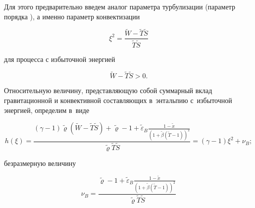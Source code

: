  Для этого предварительно введем аналог параметра турбулизации \cite{lukashev:bib50} (параметр порядка \cite{lukashev:bib29}), а именно параметр конвектизации

\begin{equation}

\label{lukashev:xi}

\xi^2=\frac{ \widetilde{W}-\widetilde{T} \widetilde{S}}{\widetilde{T} \widetilde{S}}

\end{equation}

для процесса с избыточной энергией

\begin{equation}

\label{lukashev:izbit}

\widetilde{W}- \widetilde{T} \widetilde{S}>0.

\end{equation}



Относительную величину, представляющую собой суммарный вклад гравитационной и конвективной составляющих в~энтальпию с~избыточной энергией, определим в~виде

\begin{equation}

\label{lukashev:Uh}

h(\xi)=\frac{(\gamma-1)\widetilde{\varrho}

(\widetilde{W}-\widetilde{T}\widetilde{S})+

\widetilde{\varrho}-1+

\widetilde{\varepsilon}_B

\frac{1- \widetilde{x}}{(1+\widetilde{\beta}(\widetilde{T}-1))^2} }

{\widetilde{\varrho}\widetilde{T}\widetilde{S}}=

(\gamma-1)\xi^2+\nu_B;

\end{equation}

безразмерную величину

\begin{equation}

\label{lukashev:benar}

\nu_B=

\frac{\widetilde{\varrho}-1+\widetilde{\varepsilon}_B

\frac{1- \widetilde{x}}{(1+\widetilde{\beta}(\widetilde{T}-1))^2} }{\widetilde{\varrho}\widetilde{T}\widetilde{S}}

\end{equation}

